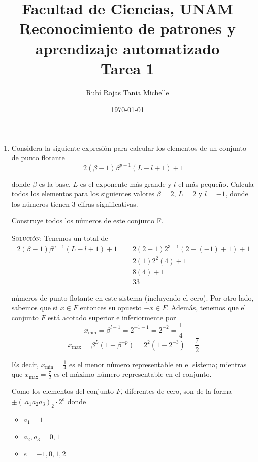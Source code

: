 \documentclass[letterpaper,11pt]{article}
\title{Facultad de Ciencias, UNAM \\ 
       Reconocimiento de patrones y aprendizaje automatizado \\ 
       Tarea 1}
\author{Rubí Rojas Tania Michelle}
\date{\today}
\begin{document}
\maketitle

\begin{enumerate}
    \item Considera la siguiente expresión para calcular los elementos de un 
    conjunto de punto flotante 
    \begin{equation*}
        2(\beta - 1) \beta^{p-1} (L - l + 1) + 1
    \end{equation*}

    donde $\beta$ es la base, $L$ es el exponente más grande y $l$ el más 
    pequeño. Calcula todos los elementos para los siguientes valores 
    $\beta = 2$, $L = 2$ y $l = -1$, donde los números tienen $3$ cifras 
    significativas.

    Construye todos los números de este conjunto F.

    \textsc{Solución:} Tenemos un total de 
    \begin{align*}
        2(\beta - 1) \beta^{p-1} (L - l + 1) + 1
        &= 2(2 - 1) 2^{3-1} (2 - (-1) + 1) + 1 \\ 
        &= 2(1) 2^{2} (4) + 1 \\ 
        &= 8 (4) + 1 \\ 
        &= 33
    \end{align*}

    números de punto flotante en este sistema (incluyendo el cero). Por otro 
    lado, sabemos que si $x \in F$ entonces su opuesto $-x \in F$. Además, 
    tenemos que el conjunto $F$ está acotado superior e inferiormente por 
    \begin{equation*}
        x_{\text{min}} = \beta^{l-1} = 2^{-1-1} = 2^{-2} = \frac{1}{4}
    \end{equation*}
    \begin{equation*}
        x_{\text{max}} 
        = \beta^L (1 - \beta^{-p}) 
        = 2^2 (1 - 2^{-3})
        = \frac{7}{2}
    \end{equation*}

    Es decir, $x_{\text{min}} = \frac{1}{4}$ es el menor número representable 
    en el sistema; mientras que $x_{\text{max}} = \frac{7}{2}$ es el máximo 
    número representable en el conjunto.

    Como los elementos del conjunto $F$, diferentes de cero, son de la forma 
    $\pm (.a_1 a_2 a_3)_2 \cdot 2^e$ donde 
    \begin{itemize}
        \item $a_1 = 1$
        \item $a_2, a_3 = 0, 1$
        \item $e = -1, 0, 1, 2$
    \end{itemize}


\end{enumerate}
\end{document}
